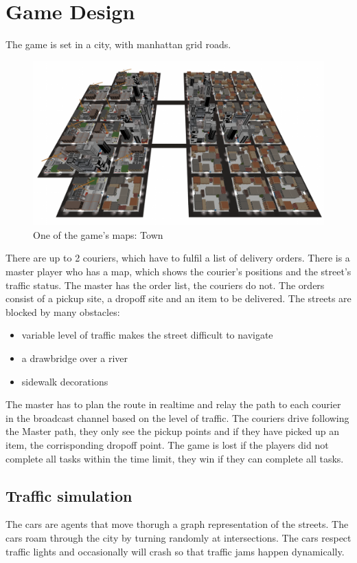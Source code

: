 \documentclass[12pt]{article}
\begin{document}
\section{Game Design}
The game is set in a city, with manhattan grid roads.
\begin{figure}[H]
\includegraphics[width=\textwidth]{map_town}
\caption{One of the game's maps: Town}
\end{figure}
There are up to 2 couriers, which have to fulfil a list of delivery orders.
There is a master player who has a map, which shows the courier's positions and the street's traffic status. The master has the order list, the couriers do not.
The orders consist of a pickup site, a dropoff site and an item to be delivered.
The streets are blocked by many obstacles:
\begin{itemize}
  \item variable level of traffic makes the street difficult to navigate
  \item a drawbridge over a river
  \item sidewalk decorations
\end{itemize}
The master has to plan the route in realtime and relay the path to each courier in the broadcast channel based on the level of traffic.
The couriers drive following the Master path, they only see the pickup points and if they have picked up an item, the corrisponding dropoff point.
The game is lost if the players did not complete all tasks within the time limit, they win if they can complete all tasks.

\subsection{Traffic simulation}
The cars are agents that move thorugh a graph representation of the streets. The cars roam through the city by turning randomly at intersections. The cars respect traffic lights and occasionally will crash so that traffic jams happen dynamically.
\end{document}
